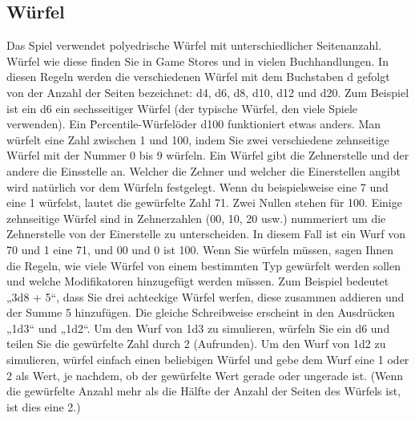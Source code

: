 \subsection{Würfel}
Das Spiel verwendet polyedrische Würfel mit unterschiedlicher Seitenanzahl. Würfel wie diese finden Sie in Game Stores und in vielen Buchhandlungen. In diesen Regeln werden die verschiedenen Würfel mit dem Buchstaben d gefolgt von der Anzahl der Seiten bezeichnet: d4, d6, d8, d10, d12 und d20. Zum Beispiel ist ein d6 ein sechsseitiger Würfel (der typische Würfel, den viele Spiele verwenden). Ein \"Percentile-Würfel\" oder d100 funktioniert etwas anders. Man würfelt eine Zahl zwischen 1 und 100, indem Sie zwei verschiedene zehnseitige Würfel mit der Nummer 0 bis 9 würfeln. Ein Würfel gibt die Zehnerstelle und der andere die Einsstelle an. Welcher die Zehner und welcher die Einerstellen angibt wird natürlich vor dem Würfeln festgelegt. Wenn du beispielsweise eine 7 und eine 1 würfelst, lautet die gewürfelte Zahl 71. Zwei Nullen stehen für 100. Einige zehnseitige Würfel sind in Zehnerzahlen (00, 10, 20 usw.) nummeriert um die Zehnerstelle von der Einerstelle zu unterscheiden. In diesem Fall ist ein Wurf von 70 und 1 eine 71, und 00 und 0 ist 100. Wenn Sie würfeln müssen, sagen Ihnen die Regeln, wie viele Würfel von einem bestimmten Typ gewürfelt werden sollen und welche Modifikatoren hinzugefügt werden müssen. Zum Beispiel bedeutet „3d8 + 5“, dass Sie drei achteckige Würfel werfen, diese zusammen addieren und der Summe 5 hinzufügen. Die gleiche Schreibweise erscheint in den Ausdrücken „1d3“ und „1d2“. Um den Wurf von 1d3 zu simulieren, würfeln Sie ein d6 und teilen Sie die gewürfelte Zahl durch 2 (Aufrunden).
Um den Wurf von 1d2 zu simulieren, würfel einfach einen beliebigen Würfel und gebe dem Wurf eine 1 oder 2 als Wert, je nachdem, ob der gewürfelte Wert gerade oder ungerade ist. (Wenn die gewürfelte Anzahl mehr als die Hälfte der Anzahl der Seiten des Würfels ist, ist dies eine 2.)


